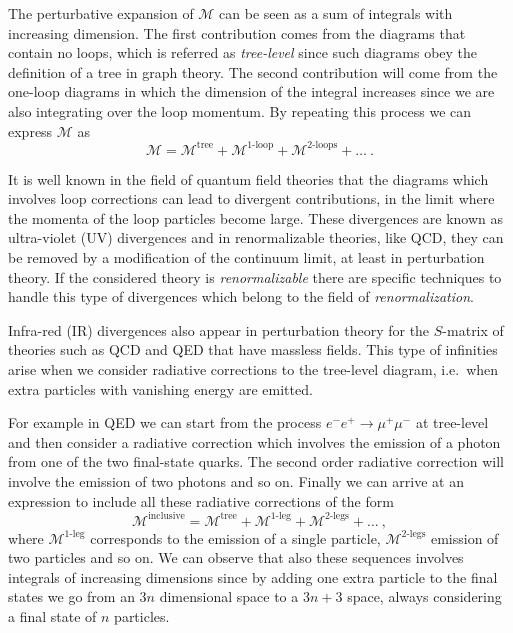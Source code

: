 \documentclass[../main/main.tex]{subfiles}
\begin{document}
The perturbative expansion of $\mathcal{M}$ can be seen as a sum of integrals with increasing dimension. The first contribution comes 
from the diagrams that contain no loops, which is referred as \emph{tree-level} since such diagrams obey the definition of a tree in graph
theory. The second contribution will come from the one-loop diagrams in which the dimension of the integral increases 
since we are also integrating over the loop momentum. By repeating this process we can express $\mathcal{M}$ as
\begin{equation}
	\mathcal{M}=\mathcal{M}^{\text{tree}} + \mathcal{M}^{\text{1-loop}} + \mathcal{M}^{\text{2-loops}} + \dots \ .
\end{equation}

It is well known in the field of quantum field theories that the diagrams which involves loop corrections can lead to divergent contributions, in the limit where the momenta of the loop particles become large. These divergences are known as ultra-violet (UV) divergences and in renormalizable theories, like QCD, they can be removed by a modification of the continuum limit, at least in perturbation theory.
If the considered theory is \emph{renormalizable} there are specific techniques to handle this type of divergences which belong to the 
field of \emph{renormalization}.

Infra-red (IR) divergences also appear in perturbation theory for the $S$-matrix of theories such as QCD and QED that have massless fields.
This type of infinities arise when we consider radiative corrections to the tree-level diagram, i.e.\ when extra particles with vanishing energy are emitted.

For example in QED we can start from the process $e^- e^+ \to \mu^+ \mu^-$ at tree-level and then consider a radiative correction which 
involves the emission of a photon from one of the two final-state quarks. The second order radiative correction will involve the emission of 
two photons and so on. Finally we can arrive at an expression to include all these radiative corrections of the form
\begin{equation}
	\mathcal{M}^{\text{inclusive}} = \mathcal{M}^{\text{tree}} + \mathcal{M}^{\text{1-leg}} + \mathcal{M}^{\text{2-legs}} + \dots \ ,
\end{equation}
where $\mathcal{M}^{\text{1-leg}}$ corresponds to the emission of a single particle,  $\mathcal{M}^{\text{2-legs}}$ emission of two
particles and so on.
We can observe that also these sequences involves integrals of increasing dimensions since by adding one extra particle to the final states 
we go from an $3n$ dimensional space to a $3n + 3$ space, always considering a final state of $n$ particles.
\end{document}
